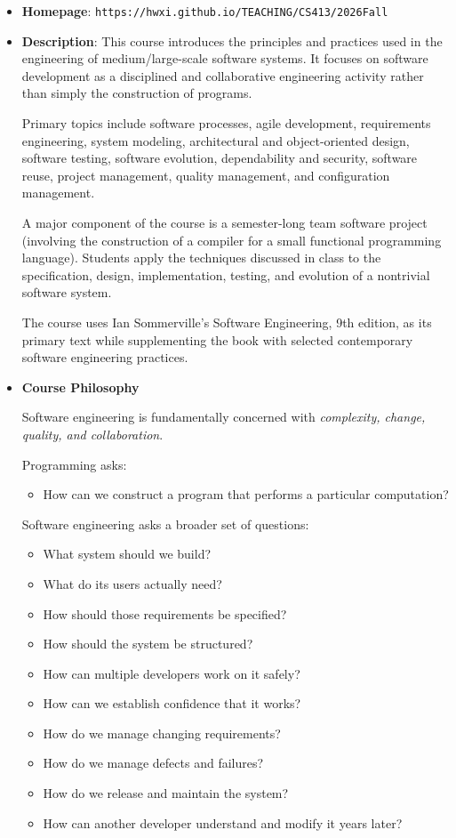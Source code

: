 \documentclass[11pt]{article}
\begin{document}
\begin{itemize}
\item {\bf Homepage}:
{\tt  https://hwxi.github.io/TEACHING/CS413/2026Fall}

\item {\bf Description}:
This course introduces the principles and practices used in the
engineering of medium/large-scale software systems. It focuses on
software development as a disciplined and collaborative engineering
activity rather than simply the construction of programs.

Primary topics include software processes, agile development,
requirements engineering, system modeling, architectural and
object-oriented design, software testing, software evolution,
dependability and security, software reuse, project management,
quality management, and configuration management.

A major component of the course is a semester-long team software
project (involving the construction of a compiler for a small
functional programming language). Students apply the techniques
discussed in class to the specification, design, implementation,
testing, and evolution of a nontrivial software system.

The course uses Ian Sommerville's Software Engineering, 9th edition,
as its primary text while supplementing the book with selected
contemporary software engineering practices.

\item
{\bf Course Philosophy}

Software engineering is fundamentally concerned with {\em complexity,
change, quality, and collaboration}.

Programming asks:
\begin{itemize}
\item How can we construct a program that performs a particular computation?
\end{itemize}

Software engineering asks a broader set of questions:
\begin{itemize}
\item What system should we build?
\item What do its users actually need?
\item How should those requirements be specified?
\item How should the system be structured?
\item How can multiple developers work on it safely?
\item How can we establish confidence that it works?
\item How do we manage changing requirements?
\item How do we manage defects and failures?
\item How do we release and maintain the system?
\item How can another developer understand and modify it years later?
\end{itemize}


\end{itemize}
\end{document}
